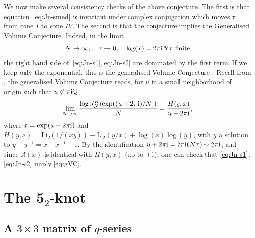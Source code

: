 \documentclass[12pt,reqno]{amsart}
\theoremstyle{definition}
\def\Li{\mathrm{Li}}
\def\ri{\mathrm{i}}
\def\ri{{\rm i}}
\def\md{\mathbf}
\def\IQ{\mathbb{Q}}
\newcommand{\knot}[1]{\md{#1}}
\begin{document}
We now make several consistency checks of the above conjecture. The first is
that equation~\eqref{eq:Jn-smed} is invariant
under complex conjugation which moves $\tau$ from cone $I$ to cone $IV$.
The second is that the conjecture implies the Generalised Volume Conjecture.
Indeed, in the limit
  \begin{equation}
    N\rightarrow \infty, \quad \tau \rightarrow 0, \quad \log(x) =
    2\pi\ri N\tau \text{ finite}
  \end{equation}
  the right hand side of~\eqref{eq:Jn-s1},\eqref{eq:Jn-s2} are dominated by the
  first term.  If we keep only the exponential, this is the
  generalised Volume Conjecture \cite{Murakami2011:ivc,gukov}.
  Recall from \cite{Murakami2011:ivc}, the generalised Volume
  Conjecture reads, for $u$ in a small neighborhood of origin such
  that $u\not\in \pi\ri\IQ$,
  \begin{equation}
    \lim_{N\rightarrow \infty}\frac{\log
      J_N^{K}(\exp((u+2\pi\ri)/N))}{N}
    = \frac{H(y,x)}{u+2\pi\ri},
    \label{eq:gVC}
  \end{equation}
  where $x = \exp(u+2\pi\ri)$ and $
    H(y,x) = \Li_2(1/(xy)) - \Li_2(y/x) + \log(x)\log(y)$, 
  with $y$ a solution to $y+y^{-1} = x+x^{-1}-1$.
  By the identification $u + 2\pi\ri = 2\pi\ri (N\tau) \sim 2\pi\ri$, 
  and since $A(x)$ is identical with $H(y,x)$ (up to $\pm 1$), one can
  check that \eqref{eq:Jn-s1},\eqref{eq:Jn-s2} imply \eqref{eq:gVC}.
  

\section{The $\knot{5}_2$-knot}
\label{sec.52}

\subsection{A $3 \times 3$ matrix of $q$-series}
\label{sub.52q3}
\end{document}
